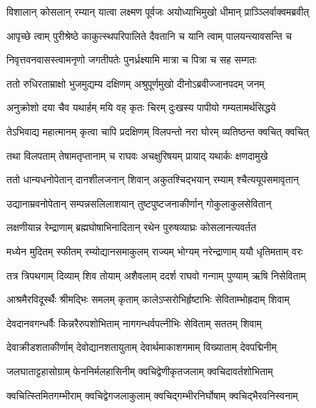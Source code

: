 
\twolineshloka
{विशालान् कोसलान् रम्यान् यात्वा लक्ष्मण पूर्वजः}
{अयोध्याभिमुखो धीमान् प्राञ्ञ्लिर्वाक्वमब्रवीत्} %

\twolineshloka
{आपृच्छे त्वाम् पुरीश्रेष्ठे काकुत्स्थपरिपालिते}
{दैवतानि च यानि त्वाम् पालयन्त्यावसन्ति च} %

\twolineshloka
{निवृत्तवनवासस्त्वामनृणो जगतीपतेः}
{पुनर्ध्रक्ष्यामि मात्रा च पित्रा च सह सम्गतः} %

\twolineshloka
{ततो रुधिरताम्राक्षो भुजमुद्यम्य दक्षिणम्}
{अश्रुपूर्णमुखो दीनोऽब्रवीज्जानपदम् जनम्} %

\twolineshloka
{अनुक्रोशो दया चैव यथार्हम् मयि वह् कृतः}
{चिरम् दुःखस्य पापीयो गम्यतामर्थसिद्धये} %

\twolineshloka
{तेऽभिवाद्य महात्मानम् कृत्वा चापि प्रदक्षिणम्}
{विलपन्तो नरा घोरम् व्यतिष्ठन्त क्वचित् क्वचित्} %

\twolineshloka
{तथा विलपताम् तेषामतृप्तानाम् च राघवः}
{अचक्षुरिषयम् प्रायाद् यथार्कः क्षणदामुखे} %

\twolineshloka
{ततो धान्यधनोपेतान् दानशीलजनान् शिवान्}
{अकुतश्चिद्भयान् रम्याम् श्चैत्ययूपसमावृतान्} %

\twolineshloka
{उद्यानाम्रवनोपेतान् सम्पन्नसलिलाशयान्}
{तुष्टपुष्टजनाकीर्णान् गोकुलाकुलसेवितान्} %

\twolineshloka
{लक्षणीयान्न रेम्द्राणाम् ब्रह्मघोषाभिनादितान्}
{रथेन पुरुषव्याघ्रः कोसलानत्यवर्तत} %

\twolineshloka
{मध्येन मुदितम् स्फीतम् रम्योद्यानसमाकुलम्}
{राज्यम् भोग्यम् नरेन्द्राणाम् ययौ धृतिमताम् वरः} %

\twolineshloka
{तत्र त्रिपथगाम् दिव्याम् शिव तोयाम् अशैवलाम्}
{ददर्श राघवो गन्गाम् पुण्याम् ऋषि निसेविताम्} %

\twolineshloka
{आश्रमैरविदूर्स्थैः श्रीमद्भिः समलम् कृताम्}
{कालेऽप्सरोभिर्हृष्टाभिः सेविताम्भोह्रदाम् शिवाम्} %

\twolineshloka
{देवदानवगन्धर्वैः किन्नरैरुपशोभिताम्}
{नागगन्धर्वपत्नीभिः सेविताम् सततम् शिवाम्} %

\twolineshloka
{देवाक्रीडशताकीर्णाम् देवोद्यानशतायुताम्}
{देवार्थमाकाशगमाम् विख्याताम् देवपद्मिनीम्} %

\twolineshloka
{जलघाताट्टहासोग्राम् फेननिर्मलहासिनीम्}
{क्वचिद्वेणीकृतजलाम् क्वचिदावर्तशोभिताम्} %

\twolineshloka
{क्वचित्स्तिमितगम्भीराम् क्वचिद्वेगजलाकुलाम्}
{क्वचिद्गम्भीरनिर्घोषाम् क्वचिद्भैरवनिस्वनाम्} %

